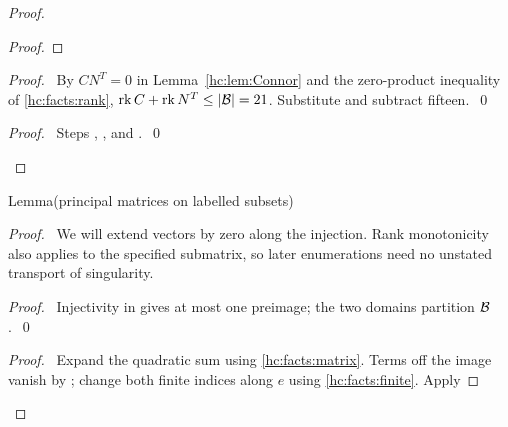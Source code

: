 \begin{mergedproofsection}
\begin{proof}
\begin{proof}
 \end{proof}
 \begin{proof}\pf\ By $CN^T=0$ in Lemma~\ref{hc:lem:Connor} and
  the zero-product inequality of \ref{hc:facts:rank},
  $\operatorname{rk}C+\operatorname{rk}N^T\le|{\mathcal B}|=21$.
  Substitute  and subtract fifteen.~\qed\end{proof}
 \qedstep
 \begin{proof}\pf\ Steps , ,
  and .~\qed\end{proof}
\end{proof}

\begin{namedresult}{Lemma}{(principal matrices on labelled subsets)}\label{hc:lem:principal}
 \leavevmode\par
\end{namedresult}
\begin{proof}
 \pfsketch\ We will extend vectors by zero along the injection.
 Rank monotonicity also applies to the specified submatrix, so later
 enumerations need no unstated transport of singularity.
 \begin{proof}\pf\ Injectivity in  gives at most one
  preimage; the two domains partition ${\mathcal B}$.~\qed\end{proof}
 \begin{proof}\pf\ Expand the quadratic sum using \ref{hc:facts:matrix}.
  Terms off the image vanish by ; change both
  finite indices along $e$ using \ref{hc:facts:finite}. Apply

\end{proof}
\end{proof}
\end{mergedproofsection}
